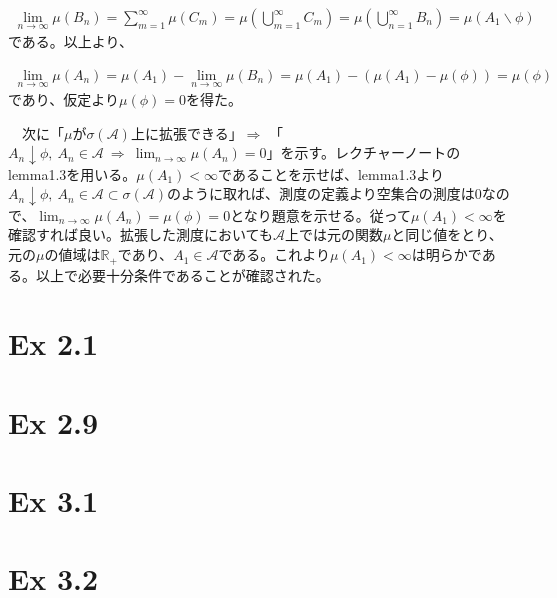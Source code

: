 \documentclass{article}
\begin{document}
\begin{align*}
	\lim_{n \to \infty} \mu \left( B_n \right) = \sum_{m = 1}^{\infty} \mu \left( C_m \right) = \mu \left( \bigcup_{m = 1}^{\infty} C_m \right) = \mu \left( \bigcup_{n = 1}^{\infty} B_n \right) = \mu \left( A_1 \backslash \phi \right)
\end{align*}
である。以上より、

\begin{align*}
	\lim_{n \to \infty} \mu \left( A_n \right) = \mu \left( A_1 \right) - \lim_{n \to \infty} \mu\left( B_n \right) = \mu \left( A_1 \right) - \left( \mu \left( A_1 \right) - \mu \left( \phi \right) \right) = \mu \left( \phi \right)
\end{align*}
であり、仮定より$\mu \left( \phi \right) = 0$を得た。


　次に「$\mu$が$\sigma\left( \mathcal{A} \right)$上に拡張できる」$\Rightarrow$ 「$A_n \downarrow \phi,\ A_n \in \mathcal{A}\ \Rightarrow\ \lim_{n \to \infty} \mu \left( A_n \right) = 0$」を示す。レクチャーノートのlemma1.3を用いる。$\mu \left( A_1 \right) < \infty$であることを示せば、lemma1.3より$A_n \downarrow \phi,\ A_n \in \mathcal{A} \subset \sigma\left(\mathcal{A} \right)$のように取れば、測度の定義より空集合の測度は$0$なので、$\lim_{n \to \infty} \mu \left( A_n \right) = \mu \left( \phi \right) = 0$となり題意を示せる。従って$\mu \left( A_1 \right) < \infty$を確認すれば良い。拡張した測度においても$\mathcal{A}$上では元の関数$\mu$と同じ値をとり、元の$\mu$の値域は$\mathbb{R}_{+}$であり、$A_1 \in \mathcal{A}$である。これより$\mu \left( A_1 \right) < \infty$は明らかである。以上で必要十分条件であることが確認された。

\section{Ex 2.1}

\section{Ex 2.9}

\section{Ex 3.1}

\section{Ex 3.2}
\end{document}
